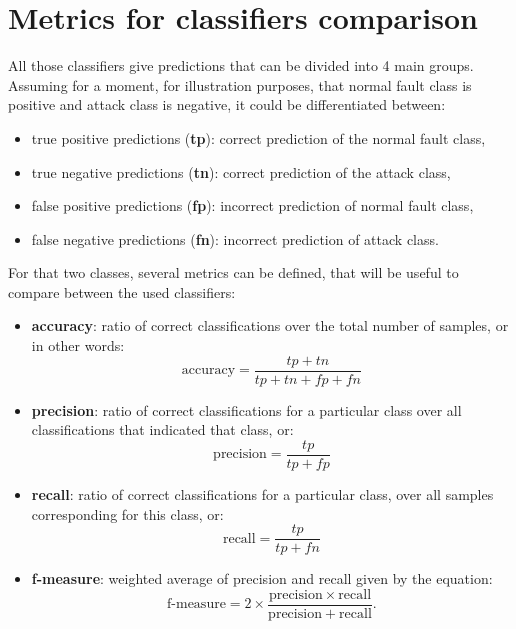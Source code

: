 \section{Metrics for classifiers comparison}
All those classifiers give predictions that can be divided into 4 main groups. Assuming for a moment, for illustration purposes, that normal fault class is positive and attack class is negative, it could be differentiated between:
\begin{itemize}
    \item true positive predictions (\textbf{tp}): correct prediction of the normal fault class,
    \item true negative predictions (\textbf{tn}): correct prediction of the attack class,
    \item false positive predictions (\textbf{fp}): incorrect prediction of normal fault class,
    \item false negative predictions (\textbf{fn}): incorrect prediction of attack class.
\end{itemize}
For that two classes, several metrics can be defined, that will be useful to compare between the used classifiers: 
\begin{itemize}
    \item \textbf{accuracy}: ratio of correct classifications over the total number of samples, or in other words:
    \begin{equation}
        \text{accuracy} = \frac{tp + tn}{tp + tn + fp + fn}
    \end{equation}
    \item \textbf{precision}:  ratio of correct classifications for a particular class over all classifications that indicated that class, or:
    \begin{equation}
        \text{precision} = \frac{tp}{tp + fp}
    \end{equation}
    \item \textbf{recall}: ratio of correct classifications for a particular class, over all samples corresponding for this class, or:
    \begin{equation}
        \text{recall} = \frac{tp}{tp + fn}
    \end{equation}
    \item \textbf{f-measure}: weighted average of precision and recall given by the equation: 
    \begin{equation*}
        \text{f-measure} = 2 \times \frac{\mathrm{precision} \times \mathrm{recall}}{\mathrm{precision} + \mathrm{recall}}.
    \end{equation*}
\end{itemize}

